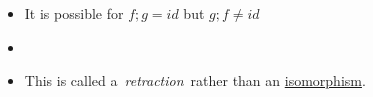 \begin{itemize}
    \item It is possible for $f;g=id$ but $g;f \ne id$
    \item {}
    \item This is called a \,\emph{retraction}\, rather than an \href{doc/1 math/Seven Sketches in Compositionality/Chapter 3: Databases/2 Categories/5 Isomorphisms in a category/1 Isomorphism}{isomorphism}.
  \end{itemize}
